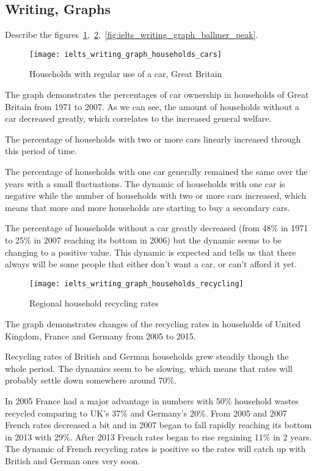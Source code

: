 \subsection*{Writing, Graphs}
Describe the figures~\ref{fig:ielts_writing_graph_households_cars},~\ref{fig:ielts_writing_graph_households_recycling},~\ref{fig:ielts_writing_graph_ballmer_peak}.

\begin{figure}[H]
  \centering
    \texttt{[image: ielts\_writing\_graph\_households\_cars]}
  \caption{Households with regular use of a car, Great Britain}
  \label{fig:ielts_writing_graph_households_cars}
\end{figure}

\begin{answer}
The graph demonstrates the percentages of car ownership in households of Great Britain from 1971 to 2007. 
As we can see, the amount of households without a car decreased greatly, which correlates to the increased general welfare.

The percentage of households with two or more cars linearly increased through this period of time.

The percentage of households with one car generally remained the same over the years with a small fluctuations.
The dynamic of households with one car is negative while the number of households with two or more cars  increased, which means that more and more households are starting to buy a secondary cars.

The percentage of households without a car greatly decreased (from 48\% in 1971 to 25\% in 2007 reaching its bottom in 2006) but the dynamic seems to be changing to a positive value.
This dynamic is expected and tells us that there always will be some people that either don't want a car, or can't afford it yet.
\end{answer}

\begin{figure}[H]
  \centering
    \texttt{[image: ielts\_writing\_graph\_households\_recycling]}
  \caption{Regional household recycling rates}
  \label{fig:ielts_writing_graph_households_recycling}
\end{figure}

\begin{answer}
The graph demonstrates changes of the recycling rates in households of United Kingdom, France and Germany from 2005 to 2015. 

Recycling rates of British and German households grew steadily though the whole period. 
The dynamics seem to be slowing, which means that rates will probably settle down somewhere around 70\%. 

In 2005 France had a major advantage in numbers with 50\% household wastes recycled comparing to UK's 37\% and Germany's 20\%. 
From 2005 and 2007 French rates decreased a bit and in 2007 began to fall rapidly reaching its bottom in 2013 with 29\%. 
After 2013 French rates began to rise regaining 11\% in 2 years.
The dynamic of French recycling rates is positive so the rates will catch up with British and German ones very soon.  
\end{answer}

